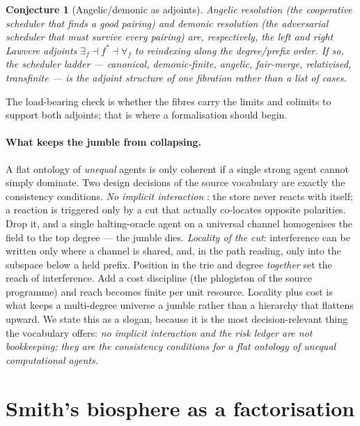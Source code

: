 \documentclass[11pt]{article}
\theoremstyle{definition}
\theoremstyle{plain}
\newtheorem{conjecture}{Conjecture}
\theoremstyle{remark}
\begin{document}
\begin{conjecture}[Angelic/demonic as adjoints]\label{conj:adjoint}
Angelic resolution (the cooperative scheduler that \emph{finds} a good pairing)
and demonic resolution (the adversarial scheduler that must survive \emph{every}
pairing) are, respectively, the left and right Lawvere adjoints
$\exists_f \dashv f^{*} \dashv \forall_f$ to reindexing along the
degree/prefix order. If so, the scheduler ladder --- canonical, demonic-finite,
angelic, fair-merge, relativised, transfinite --- is the adjoint structure of one
fibration rather than a list of cases.
\end{conjecture}

\noindent
The load-bearing check is whether the fibres carry the limits and colimits to
support both adjoints; that is where a formalisation should begin.

\paragraph{What keeps the jumble from collapsing.}
A flat ontology of \emph{unequal} agents is only coherent if a single strong agent
cannot simply dominate. Two design decisions of the source vocabulary are exactly
the consistency conditions. \emph{No implicit interaction} \cite{paths}: the store
never reacts with itself; a reaction is triggered only by a cut that actually
co-locates opposite polarities. Drop it, and a single halting-oracle agent on a
universal channel homogenises the field to the top degree --- the jumble dies.
\emph{Locality of the cut}: interference can be written only where a channel is
shared, and, in the path reading, only into the subspace below a held prefix.
Position in the trie and degree \emph{together} set the reach of interference. Add
a cost discipline (the phlogiston of the source programme) and reach becomes finite
per unit resource. Locality plus cost is what keeps a multi-degree universe a
jumble rather than a hierarchy that flattens upward. We state this as a slogan,
because it is the most decision-relevant thing the vocabulary offers: \emph{no
implicit interaction and the risk ledger are not bookkeeping; they are the
consistency conditions for a flat ontology of unequal computational agents.}

\section{Smith's biosphere as a factorisation}\label{sec:smith}
\end{document}
